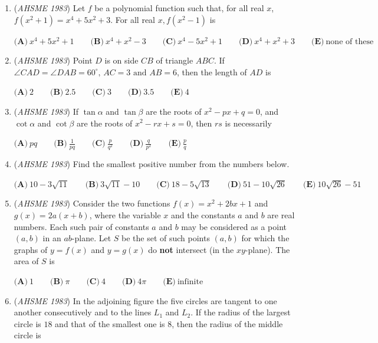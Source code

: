 \begin{enumerate}
 $\textbf{(A)} \ A \qquad  \textbf{(B)} \ B \qquad  \textbf{(C)} \ C \qquad  \textbf{(D)} \ D \qquad  \textbf{(E)} \ E$


	\item (\textit{AHSME 1983}) Let $f$ be a polynomial function such that, for all real $x$,
$f(x^2 + 1) = x^4 + 5x^2 + 3$.
For all real $x, f(x^2-1)$ is


 $\textbf{(A)}\ x^4+5x^2+1\qquad \textbf{(B)}\ x^4+x^2-3\qquad \textbf{(C)}\ x^4-5x^2+1\qquad \textbf{(D)}\ x^4+x^2+3\qquad \textbf{(E)}\ \text{none of these}$


	\item (\textit{AHSME 1983}) Point $D$ is on side $CB$ of triangle $ABC$. If 
$\angle{CAD} = \angle{DAB} = 60^\circ\mbox{, }AC = 3\mbox{ and }AB = 6$, 
then the length of $AD$ is 


 $\textbf{(A)} \ 2 \qquad  \textbf{(B)} \ 2.5 \qquad  \textbf{(C)} \ 3 \qquad  \textbf{(D)} \ 3.5 \qquad  \textbf{(E)} \ 4$


	\item (\textit{AHSME 1983}) If $\tan{\alpha}$ and $\tan{\beta}$ are the roots of $x^2 - px + q = 0$, and $\cot{\alpha}$ and $\cot{\beta}$
are the roots of $x^2 - rx + s = 0$, then $rs$ is necessarily 


 $\textbf{(A)} \ pq \qquad  \textbf{(B)} \ \frac{1}{pq} \qquad  \textbf{(C)} \ \frac{p}{q^2} \qquad  \textbf{(D)}\ \frac{q}{p^2}\qquad \textbf{(E)}\ \frac{p}{q}$


	\item (\textit{AHSME 1983}) Find the smallest positive number from the numbers below.


 $\textbf{(A)} \ 10-3\sqrt{11} \qquad  \textbf{(B)} \ 3\sqrt{11}-10 \qquad  \textbf{(C)}\ 18-5\sqrt{13}\qquad \textbf{(D)}\ 51-10\sqrt{26}\qquad \textbf{(E)}\ 10\sqrt{26}-51$


	\item (\textit{AHSME 1983}) Consider the two functions $f(x) = x^2+2bx+1$ and $g(x) = 2a(x+b)$, where the variable $x$ and the constants $a$ and $b$ are real numbers. 
Each such pair of constants $a$ and $b$ may be considered as a point $(a,b)$ in an $ab$-plane. 
Let $S$ be the set of such points $(a,b)$ for which the graphs of $y = f(x)$ and $y = g(x)$ do \textbf{not} intersect (in the $xy$-plane). The area of $S$ is 


 $\textbf{(A)} \ 1 \qquad  \textbf{(B)} \ \pi \qquad  \textbf{(C)} \ 4 \qquad  \textbf{(D)} \ 4 \pi \qquad  \textbf{(E)} \ \text{infinite}$


	\item (\textit{AHSME 1983}) In the adjoining figure the five circles are tangent to one another consecutively and to the lines 
$L_1$ and $L_2$. 
If the radius of the largest circle is $18$ and that of the smallest one is $8$, then the radius of the middle circle is



\end{enumerate}
